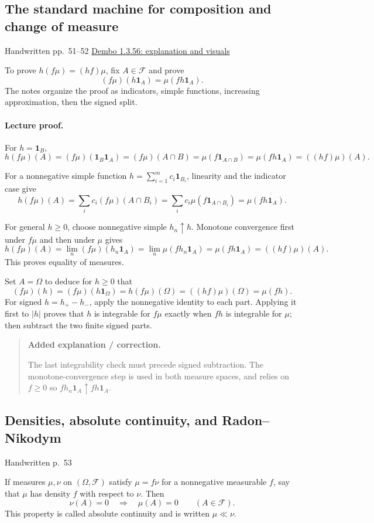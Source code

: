 \documentclass[11pt,letterpaper]{article}
\newcommand{\lecturesection}[1]{\subsection{#1}}
\begin{document}
\hypertarget{l6-s7}{}
\lecturesection{The standard machine for composition and change of measure}
{\small\textcolor{lectureink}{Handwritten pp.\ 51--52} \quad \href{https://josephrbailey.com/probability/\#entry-1-3-56}{Dembo 1.3.56: explanation and visuals}}

To prove $h(f\mu)=(hf)\mu$, fix $A\in\mathcal F$ and prove \[(f\mu)(h\mathbf1_A)=\mu(fh\mathbf1_A).\] The notes organize the proof as indicators, simple functions, increasing approximation, then the signed split.

\paragraph{Lecture proof.}
For $h=\mathbf1_B$, \[h(f\mu)(A)=(f\mu)(\mathbf1_B\mathbf1_A)=(f\mu)(A\cap B)=\mu(f\mathbf1_{A\cap B})=\mu(fh\mathbf1_A)=((hf)\mu)(A).\]

For a nonnegative simple function $h=\sum_{i=1}^{m}c_i\mathbf1_{B_i}$, linearity and the indicator case give \[h(f\mu)(A)=\sum_i c_i(f\mu)(A\cap B_i)=\sum_i c_i\mu(f\mathbf1_{A\cap B_i})=\mu(fh\mathbf1_A).\]

For general $h\ge0$, choose nonnegative simple $h_n\uparrow h$. Monotone convergence first under $f\mu$ and then under $\mu$ gives \[h(f\mu)(A)=\lim_n(f\mu)(h_n\mathbf1_A)=\lim_n\mu(fh_n\mathbf1_A)=\mu(fh\mathbf1_A)=((hf)\mu)(A).\] This proves equality of measures.

Set $A=\Omega$ to deduce for $h\ge0$ that \[(f\mu)(h)=(f\mu)(h\mathbf1_\Omega)=h(f\mu)(\Omega)=((hf)\mu)(\Omega)=\mu(fh).\] For signed $h=h_+-h_-$, apply the nonnegative identity to each part. Applying it first to $|h|$ proves that $h$ is integrable for $f\mu$ exactly when $fh$ is integrable for $\mu$; then subtract the two finite signed parts.

\begin{quote}\small\textbf{Added explanation / correction.}

The last integrability check must precede signed subtraction. The monotone-convergence step is used in both measure spaces, and relies on $f\ge0$ so $fh_n\mathbf1_A\uparrow fh\mathbf1_A$.
\end{quote}

\hypertarget{l6-s8}{}
\lecturesection{Densities, absolute continuity, and Radon--Nikodym}
{\small\textcolor{lectureink}{Handwritten p.\ 53}}

If measures $\mu,\nu$ on $(\Omega,\mathcal F)$ satisfy $\mu=f\nu$ for a nonnegative measurable $f$, say that $\mu$ has density $f$ with respect to $\nu$. Then \[\nu(A)=0\quad\Longrightarrow\quad\mu(A)=0\qquad(A\in\mathcal F).\] This property is called absolute continuity and is written $\mu\ll\nu$.
\end{document}
